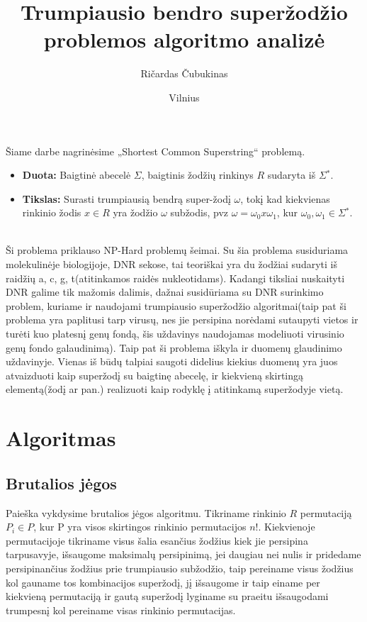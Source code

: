 \documentclass{VUMIFInfKursinis}
\institute{Informatikos institutas}
\title{Trumpiausio bendro superžodžio problemos algoritmo analizė}
\author{Ričardas Čubukinas}
\date{Vilnius \\ \the\year}
\begin{document}
\maketitle

\tableofcontents

Šiame darbe nagrinėsime „Shortest Common Superstring“ problemą.
\begin{itemize}
  \item{\textbf{Duota:} Baigtinė abecelė $\Sigma$, baigtinis žodžių rinkinys $R$ sudaryta iš $\Sigma{}^*$.}
  \item{\textbf{Tikslas:} Surasti trumpiausią bendrą super-žodį $\omega$, tokį kad kiekvienas rinkinio žodis $x \in R$ yra žodžio $\omega$ subžodis, pvz $\omega =\omega{}_0x\omega{}_1$, kur $\omega{}_0,\omega{}_1 \in \Sigma{}^*$.}
\end{itemize}\cite{ausiello1999complexity}\\

Ši problema priklauso NP-Hard problemų šeimai. Su šia problema susiduriama molekulinėje biologijoje, DNR sekose, tai teoriškai yra du žodžiai sudaryti iš raidžių {a, c, g, t}(atitinkamos raidės nukleotidams). Kadangi tiksliai nuskaityti DNR galime tik mažomis dalimis, dažnai susidūriama su DNR surinkimo problem, kuriame ir naudojami trumpiausio superžodžio algoritmai(taip pat ši problema yra paplitusi tarp virusų, nes jie persipina norėdami sutaupyti vietos ir turėti kuo platesnį genų fondą, šis uždavinys naudojamas modeliuoti virusinio genų fondo galaudinimą). Taip pat ši problema iškyla ir duomenų glaudinimo uždavinyje. Vienas iš būdų talpiai saugoti didelius kiekius duomenų yra juos atvaizduoti kaip superžodį su baigtinę abecelę, ir kiekvieną skirtingą elementą(žodį ar pan.) realizuoti kaip rodyklę į atitinkamą superžodyje vietą. \cite{ssparticle}


\section{Algoritmas}
\subsection{Brutalios jėgos}
Paieška vykdysime brutalios jėgos algoritmu. Tikriname rinkinio $R$ permutaciją $P_i \in P$, kur P yra visos skirtingos rinkinio permutacijos $n!$. Kiekvienoje permutacijoje tikriname visus šalia esančius žodžius kiek jie persipina tarpusavyje, išsaugome maksimalų persipinimą, jei daugiau nei nulis ir pridedame persipinančius žodžius prie trumpiausio subžodžio, taip pereiname visus žodžius kol gauname tos kombinacijos superžodį, jį išsaugome ir taip einame per kiekvieną permutaciją ir gautą superžodį lyginame su praeitu išsaugodami trumpesnį kol pereiname visas rinkinio permutacijas. 
\end{document}
